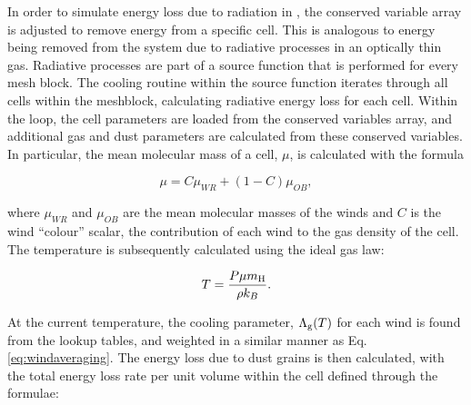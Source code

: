 In order to simulate energy loss due to radiation in \athena{}, the conserved variable array is adjusted to remove energy from a specific cell.
This is analogous to energy being removed from the system due to radiative processes in an optically thin gas.
Radiative processes are part of a source function that is performed for every mesh block.
The cooling routine within the source function iterates through all cells within the meshblock, calculating radiative energy loss for each cell.
Within the loop, the cell parameters are loaded from the conserved variables array, and additional gas and dust parameters are calculated from these conserved variables.
In particular, the mean molecular mass of a cell, $\mu$, is calculated with the formula

\begin{equation}
  \mu = C\mu_{WR} + (1-C) \mu_{OB}, \label{eq:windaveraging}
\end{equation}

\noindent
where $\mu_{WR}$ and $\mu_{OB}$ are the mean molecular masses of the winds and $C$ is the wind ``colour'' scalar, the contribution of each wind to the gas density of the cell.
The temperature is subsequently calculated using the ideal gas law:

\begin{equation}
  \label{eq:c3-idealgas}
  T = \frac{P \mu m_\text{H}}{\rho k_B}.
\end{equation}

\noindent
At the current temperature, the cooling parameter, $\Lambda_\text{g}(T)$ for each wind is found from the lookup tables, and weighted in a similar manner as Eq. \ref{eq:windaveraging}. The energy loss due to dust grains is then calculated, with the total energy loss rate per unit volume within the cell defined through the formulae:



